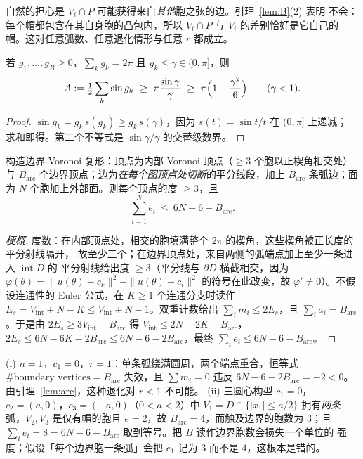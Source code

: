 \begin{remark}
自然的担心是 $V_i\cap P$ 可能获得来自\emph{其他}胞之弦的边。引理~\ref{lem:B}(2) 表明
不会：每个帽都包含在其自身胞的凸包内，所以 $V_i\cap P$ 与 $V_i$ 的差别恰好是它自己的
帽。这对任意弧数、任意退化情形与任意 $r$ 都成立。
\end{remark}

\begin{lemma}[引理 C：$P$ 的面积下界]\label{lem:C}
若 $g_1,\dots,g_B\ge0$，$\sum_kg_k=2\pi$ 且 $g_k\le\gamma\in(0,\pi]$，则
\[
A:=\tfrac12\sum_k\sin g_k\ \ge\ \pi\frac{\sin\gamma}{\gamma}\ \ge\ \pi\Bigl(1-\frac{\gamma^2}6\Bigr)
\qquad(\gamma<1).
\]
\end{lemma}
\begin{proof}
$\sin g_k=g_k\,s(g_k)\ge g_k\,s(\gamma)$，因为 $s(t)=\sin t/t$ 在 $(0,\pi]$ 上递减；
求和即得。第二个不等式是 $\sin\gamma/\gamma$ 的交替级数界。
\end{proof}

\begin{lemma}\label{lem:D}
构造边界 Voronoi 复形：顶点为内部 Voronoi 顶点（$\ge3$ 个胞以正楔角相交处）与
$B_{\mathrm{arc}}$ 个边界顶点；边为\emph{在每个图顶点处切断}的平分线段，加上
$B_{\mathrm{arc}}$ 条弧边；面为 $N$ 个胞加上外部面。则每个顶点的度 $\ge3$，且
\[
\sum_{i=1}^{N}e_i\ \le\ 6N-6-B_{\mathrm{arc}} .
\]
\end{lemma}
\begin{proof}[梗概]
度数：在内部顶点处，相交的胞填满整个 $2\pi$ 的楔角，这些楔角被正长度的平分射线隔开，
故至少三个；在边界顶点处，来自两侧的弧端点加上至少一条进入 $\operatorname{int}D$ 的
平分射线给出度 $\ge3$（平分线与 $\partial D$ 横截相交，因为
$\varphi(\theta)=\|u(\theta)-c_k\|^2-\|u(\theta)-c_i\|^2$ 的符号在此改变，故
$\varphi'\ne0$）。不假设连通性的 Euler 公式，在 $K\ge1$ 个连通分支时读作
$E_s=V_{\mathrm{int}}+N-K\le V_{\mathrm{int}}+N-1$。双重计数给出
$\sum_im_i\le2E_s$，且 $\sum_ia_i=B_{\mathrm{arc}}$。于是由
$2E_s\ge3V_{\mathrm{int}}+B_{\mathrm{arc}}$ 得
$V_{\mathrm{int}}\le2N-2K-B_{\mathrm{arc}}$，
$2E_s\le6N-6K-2B_{\mathrm{arc}}\le6N-6-2B_{\mathrm{arc}}$，最终
$\sum_ie_i\le6N-6-B_{\mathrm{arc}}$。
\end{proof}

\begin{remark}[表明假设不可去掉的精确反例]
(i) $n=1$，$c_1=0$，$r=1$：单条弧绕满圆周，两个端点重合，恒等式
$\#\text{boundary vertices}=B_{\mathrm{arc}}$ 失效，且 $\sum m_i=0$ 违反
$6N-6-2B_{\mathrm{arc}}=-2<0$。由引理~\ref{lem:arc}，这种退化对 $r<1$ 不可能。
(ii) 三圆心构型 $c_1=0$，$c_2=(a,0)$，$c_3=(-a,0)$（$0<a<2$）中
$V_1=D\cap\{|x_1|\le a/2\}$ 拥有\emph{两条}弧，$V_2,V_3$ 是仅有帽的胞且 $e=2$，故
$B_{\mathrm{arc}}=4$，而触及边界的胞数为 $3$；且
$\sum_ie_i=8=6N-6-B_{\mathrm{arc}}$ 取到等号。把 $B$ 读作边界胞数会损失一个单位的
强度；假设「每个边界胞一条弧」会把 $e_1$ 记为 $3$ 而不是 $4$，这根本是错的。
\end{remark}


